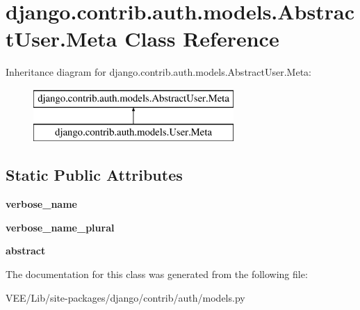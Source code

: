 \hypertarget{classdjango_1_1contrib_1_1auth_1_1models_1_1_abstract_user_1_1_meta}{}\section{django.\+contrib.\+auth.\+models.\+Abstract\+User.\+Meta Class Reference}
\label{classdjango_1_1contrib_1_1auth_1_1models_1_1_abstract_user_1_1_meta}
Inheritance diagram for django.\+contrib.\+auth.\+models.\+Abstract\+User.\+Meta\+:\begin{figure}[H]
\begin{center}
\leavevmode
\includegraphics[height=2.000000cm]{classdjango_1_1contrib_1_1auth_1_1models_1_1_abstract_user_1_1_meta}
\end{center}
\end{figure}
\subsection*{Static Public Attributes}
\begin{DoxyCompactItemize}
\item 
\mbox{\label{classdjango_1_1contrib_1_1auth_1_1models_1_1_abstract_user_1_1_meta_ae562084d8fee9efb7fafb5204506aab9}} 
{\bfseries verbose\+\_\+name}
\item 
\mbox{\label{classdjango_1_1contrib_1_1auth_1_1models_1_1_abstract_user_1_1_meta_ad3dca4c54e9dd2d355b33c02065d5f1b}} 
{\bfseries verbose\+\_\+name\+\_\+plural}
\item 
\mbox{\label{classdjango_1_1contrib_1_1auth_1_1models_1_1_abstract_user_1_1_meta_a1e13478bf0c13bd0fd9b9bab6b96cbc1}} 
{\bfseries abstract}
\end{DoxyCompactItemize}


The documentation for this class was generated from the following file\+:\begin{DoxyCompactItemize}
\item 
V\+E\+E/\+Lib/site-\/packages/django/contrib/auth/models.\+py\end{DoxyCompactItemize}
